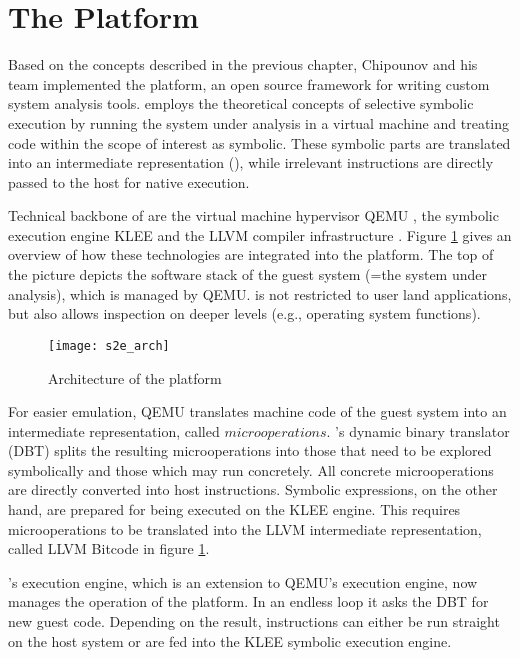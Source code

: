\section{The \sse Platform}\label{sec:platform}

Based on the concepts described in the previous chapter, Chipounov and his team implemented the \sse platform, an open source framework for writing custom system analysis tools.
\sse employs the theoretical concepts of selective symbolic execution by running the system under analysis in a virtual machine and treating code within the scope of interest as symbolic.
These symbolic parts are translated into an intermediate representation (), while irrelevant instructions are directly passed to the host for native execution.


Technical backbone of \sse are the virtual machine hypervisor QEMU \cite{qemu, qemu05}, the symbolic execution engine KLEE \cite{klee, klee08} and the LLVM compiler infrastructure \cite{llvm, llvm04}.
Figure \ref{fig:arch} gives an overview of how these technologies are integrated into the \sse platform.
The top of the picture depicts the software stack of the guest system (=the system under analysis), which is managed by QEMU.
\sse is not restricted to user land applications, but also allows inspection on deeper levels (e.g., operating system functions).


\begin{figure}
\texttt{[image: s2e\_arch]}
\caption{Architecture of the \sse platform \cite{chip12s2e}}
\label{fig:arch}
\end{figure}


For easier emulation, QEMU translates machine code of the guest system into an intermediate representation, called $microoperations$.
\sse's dynamic binary translator (DBT) splits the resulting microoperations into those that need to be explored symbolically and those which may run concretely.
All concrete microoperations are directly converted into host instructions.
Symbolic expressions, on the other hand, are prepared for being executed on the KLEE engine.
This requires microoperations to be translated into the LLVM intermediate representation, called LLVM Bitcode in figure \ref{fig:arch}.

\sse's execution engine, which is an extension to QEMU's execution engine, now manages the operation of the platform.
In an endless loop it asks the DBT for new guest code.
Depending on the result, instructions can either be run straight on the host system or are fed into the KLEE symbolic execution engine.

